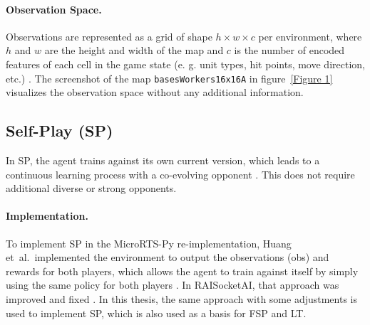 \documentclass[10pt,twocolumn,letterpaper]{article}
\begin{document}
\paragraph{Observation Space.}
Observations are represented as a grid of shape $h \times w \times c$ per environment, where $h$ and $w$ are the height and width of the map and $c$ is the number of encoded features of each cell in the game state (e. g. unit types, hit points, move direction, etc.) \cite{huang2021gym}.
The screenshot of the map \texttt{basesWorkers16x16A} in figure~\ref{Figure 1} visualizes the observation space without any additional information.

\subsection{Self-Play (SP)}
In SP, the agent trains against its own current version, which leads to a continuous learning process with a co-evolving opponent \cite{doi:10.1126/science.aar6404}.
This does not require additional diverse or strong opponents.

\paragraph{Implementation.}
To implement SP in the MicroRTS-Py re-implementation, Huang et~al.\ implemented the environment to output the observations (obs) and rewards for both players, which allows the agent to train against itself by simply using the same policy for both players \cite{huang2021gym}.
In RAISocketAI, that approach was improved and fixed \cite{goodfriend2024raisocketai}.
In this thesis, the same approach with some adjustments is used to implement SP, which is also used as a basis for FSP and LT.
\end{document}

